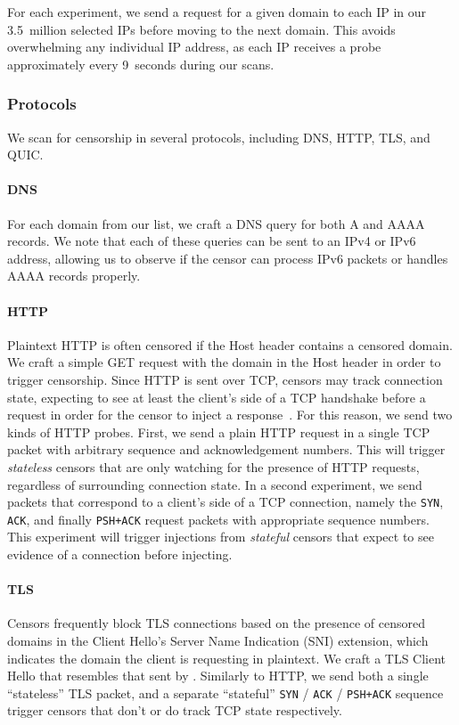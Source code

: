 For each experiment, we send a request for a given domain to each IP in our
3.5~million selected IPs before moving to the next domain. This avoids
overwhelming any individual IP address, as each IP receives a probe
approximately every 9~seconds during our scans.

\subsubsection{Protocols}
We scan for censorship in several protocols, including DNS, HTTP, TLS, and QUIC.

\paragraph{DNS} For each domain from our list, we craft a DNS query for both A
and AAAA records. We note that each of these queries can be sent to an IPv4 or
IPv6 address, allowing us to observe if the censor can process IPv6 packets or
handles AAAA records properly.

\paragraph{HTTP} Plaintext HTTP is often censored if the Host header contains 
a censored domain. We craft a simple GET request with the domain in the Host
header in order to trigger censorship. %
Since HTTP is sent over TCP, censors may track connection
state, expecting to see at least the client's side of a TCP handshake before a
request in order for the censor to inject a response~\cite{bock2021your}. For
this reason, we send two kinds of HTTP probes. First, we send a plain HTTP
request in a single TCP packet with arbitrary sequence and acknowledgement
numbers. This will trigger \emph{stateless} censors that are only watching for
the presence of HTTP requests, regardless of surrounding connection state. In a
second experiment, we send packets that correspond to a client's side of a TCP
connection, namely the \texttt{SYN}, \texttt{ACK}, and finally \texttt{PSH+ACK}
request packets with appropriate sequence numbers. This experiment will trigger
injections from \emph{stateful} censors that expect to see evidence of a
connection before injecting.

\paragraph{TLS} Censors frequently block TLS connections based on the presence
of censored domains in the Client Hello's Server Name Indication (SNI)
extension, which indicates the domain the client is requesting in plaintext. We
craft a TLS Client Hello that resembles that sent by .
Similarly to HTTP, we send both a single ``stateless'' TLS packet, and a
separate ``stateful'' \texttt{SYN} / \texttt{ACK} / \texttt{PSH+ACK} sequence
trigger censors that don't or do track TCP state respectively.

